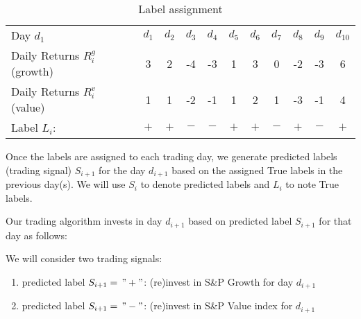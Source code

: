\documentclass{article}
\begin{document}
\begin{table}[!ht]
    \centering
    \caption{Label assignment}
    \vspace{0.1in}
    \begin{tabular}{l c c c c c  c c c c c}
    \hline
        Day $d_{1}$ & $d_{1}$ & $d_{2}$ & $d_{3}$ & $d_{4}$ & $d_{5}$ & $d_{6}$ & $d_{7}$ & $d_{8}$ & $d_{9}$ & $d_{10}$ \\
       Daily Returns $R_{i}^{g}$ (growth) & 3 & 2 & -4 & -3 & 1  & 3 & 0 & -2 & -3 & 6\\
       Daily Returns $R_{i}^{v}$ (value) & 1 & 1 & -2 & -1  & 1  & 2 & 1 & -3 & -1 & 4\\
        Label $L_{i}$: & $+$ & $+$ & $-$ & $-$ & $+$ & $+$ & $-$ & $+$ & $-$ & $+$\\
        \hline
\end{tabular}
\label{tab_label_assignment}
\end{table}

Once the labels are assigned to each trading day, we generate predicted labels (trading signal) $S_{i+1}$ for the day $d_{i+1}$ based on the assigned True labels in the previous day(s). We will use $S_{i}$ to denote predicted labels and $L_{i}$ to note True labels.

Our trading algorithm invests in day $d_{i+1}$ based on predicted label $S_{i+1}$ for that day as follows:

We will consider two trading signals:\begin{enumerate}
    \item predicted label $S_{i+1}=\, "+"$: (re)invest in S{\&}P Growth  for day $d_{i+1}$
    \item predicted label $S_{i+1}=\, "-"$: (re)invest in S{\&}P Value index for $d_{i+1}$
\end{enumerate}
\end{document}
